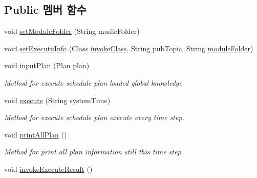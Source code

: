 \subsection*{Public 멤버 함수}
\begin{DoxyCompactItemize}
\item 
void \mbox{\hyperlink{classcom_1_1github_1_1aites_1_1framework_1_1executor_1_1_scheduler_a8fea907cf1f00aed8787c888f70cf36e}{set\+Module\+Folder}} (String mudle\+Folder)
\item 
void \mbox{\hyperlink{classcom_1_1github_1_1aites_1_1framework_1_1executor_1_1_scheduler_a7243abfd0c8967008291bce9dc7f057f}{set\+Executu\+Info}} (Class \mbox{\hyperlink{classcom_1_1github_1_1aites_1_1framework_1_1executor_1_1_scheduler_a4f3e7f2f469b4bdc442fb6c86a1a649b}{invoke\+Class}}, String pub\+Topic, String \mbox{\hyperlink{classcom_1_1github_1_1aites_1_1framework_1_1executor_1_1_scheduler_a724e814b924f7495a611c27efa8b7616}{module\+Folder}})
\item 
void \mbox{\hyperlink{classcom_1_1github_1_1aites_1_1framework_1_1executor_1_1_scheduler_a332ea628bce7c64317ed4a4f86583c24}{input\+Plan}} (\mbox{\hyperlink{classcom_1_1github_1_1aites_1_1framework_1_1planner_1_1_plan}{Plan}} plan)
\begin{DoxyCompactList}\small\item\em Method for execute schedule plan loaded global knowledge \end{DoxyCompactList}\item 
void \mbox{\hyperlink{classcom_1_1github_1_1aites_1_1framework_1_1executor_1_1_scheduler_a92aea0b2dfeb8a54321a6a1a8a081837}{execute}} (String system\+Time)
\begin{DoxyCompactList}\small\item\em Method for execute schedule plan execute every time step. \end{DoxyCompactList}\item 
void \mbox{\hyperlink{classcom_1_1github_1_1aites_1_1framework_1_1executor_1_1_scheduler_ad61eade2aa52b3b9eead21d202dc64e1}{print\+All\+Plan}} ()
\begin{DoxyCompactList}\small\item\em Method for print all plan information still this time step \end{DoxyCompactList}\item 
void \mbox{\hyperlink{classcom_1_1github_1_1aites_1_1framework_1_1executor_1_1_scheduler_a5b6abd860608f6c3dd021aed7d85bfc6}{invoke\+Execute\+Result}} ()
\end{DoxyCompactItemize}
